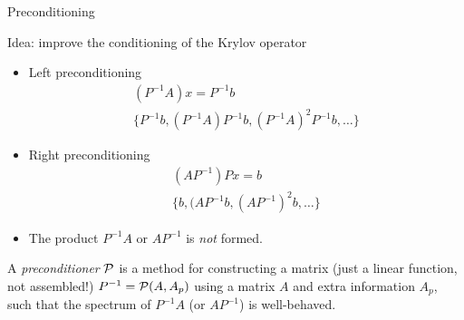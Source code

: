 \begin{frame}{Preconditioning}
  \begin{block}{Idea: improve the conditioning of the Krylov operator}
    \begin{itemize}
    \item Left preconditioning
      \vspace{-1em}
      \begin{gather*}
        (P^{-1} A) x = P^{-1} b \\
        \{ P^{-1} b, (P^{-1}A) P^{-1} b, (P^{-1}A)^2 P^{-1} b, \dotsc \}
      \end{gather*}
    \item Right preconditioning
      \vspace{-1em}
      \begin{gather*}
        (A P^{-1}) P x = b \\
        \{ b, (A P^{-1}b, (A P^{-1})^2b, \dotsc \}
      \end{gather*}
    \item The product $P^{-1}A$ or $A P^{-1}$ is \emph{not} formed.
    \end{itemize}
  \end{block}
  \begin{definition}[Preconditioner]
      A \emph{preconditioner} $\mathcal{P}$ is a method for constructing a
matrix (just a linear function, not assembled!)  $P^{-1} = \mathcal{P}(A,A_p)$
using a matrix $A$ and extra information $A_p$, such that the spectrum
of $P^{-1}A$ (or $A P^{-1}$) is well-behaved.
    \end{definition}
\end{frame}
